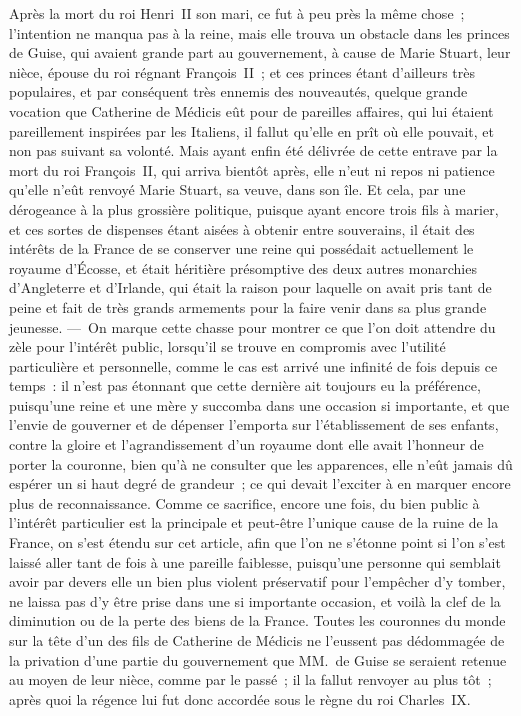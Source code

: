 \documentclass[french,twoside]{book} %
\begin{document}
Après la mort du roi Henri II son mari, ce fut à peu près la même chose ; l’intention ne manqua pas à la reine, mais elle trouva un obstacle dans les princes de Guise, qui avaient grande part au gouvernement, à cause de Marie Stuart, leur nièce, épouse du roi régnant François II ; et ces princes étant d’ailleurs très populaires, et par conséquent très ennemis des nouveautés, quelque grande vocation que Catherine de Médicis eût pour de pareilles affaires, qui lui étaient pareillement inspirées par les Italiens, il fallut qu’elle en prît où elle pouvait, et non pas suivant sa volonté. Mais ayant enfin été délivrée de cette entrave par la mort du roi François II, qui arriva bientôt après, elle n’eut ni repos ni patience qu’elle n’eût renvoyé Marie Stuart, sa veuve, dans son île. Et cela, par une dérogeance à la plus grossière politique, puisque ayant encore trois fils à marier, et ces sortes de dispenses étant aisées à obtenir entre souverains, il était des intérêts de la France de se conserver une reine qui possédait actuellement le royaume d’Écosse, et était héritière présomptive des deux autres monarchies d’Angleterre et d’Irlande, qui était la raison pour laquelle on avait pris tant de peine et fait de très grands armements pour la faire venir dans sa plus grande jeunesse. — On marque cette chasse pour montrer ce que l’on doit attendre du zèle pour l’intérêt public, lorsqu’il se trouve en compromis avec l’utilité particulière et personnelle, comme le cas est arrivé une infinité de fois depuis ce temps : il n’est pas étonnant que cette dernière ait toujours eu la préférence, puisqu’une reine et une mère y succomba dans une occasion si importante, et que l’envie de gouverner et de dépenser l’emporta sur l’établissement de ses enfants, contre la gloire et l’agrandissement d’un royaume dont elle avait l’honneur de porter la couronne, bien qu’à ne consulter que les apparences, elle n’eût jamais dû espérer un si haut degré de grandeur ; ce qui devait l’exciter à en marquer encore plus de reconnaissance. Comme ce sacrifice, encore une fois, du bien public à l’intérêt particulier est la principale et peut-être l’unique cause de la ruine de la France, on s’est étendu sur cet article, afin que l’on ne s’étonne point si l’on s’est laissé aller tant de fois à une pareille faiblesse, puisqu’une personne qui semblait avoir par devers elle un bien plus violent préservatif pour l’empêcher d’y tomber, ne laissa pas d’y être prise dans une si importante occasion, et voilà la clef de la diminution ou de la perte des biens de la France. Toutes les couronnes du monde sur la tête d’un des fils de Catherine de Médicis ne l’eussent pas dédommagée de la privation d’une partie du gouvernement que MM. de Guise se seraient retenue au moyen de leur nièce, comme par le passé ; il la fallut renvoyer au plus tôt ; après quoi la régence lui fut donc accordée sous le règne du roi Charles IX.\par
\end{document}

